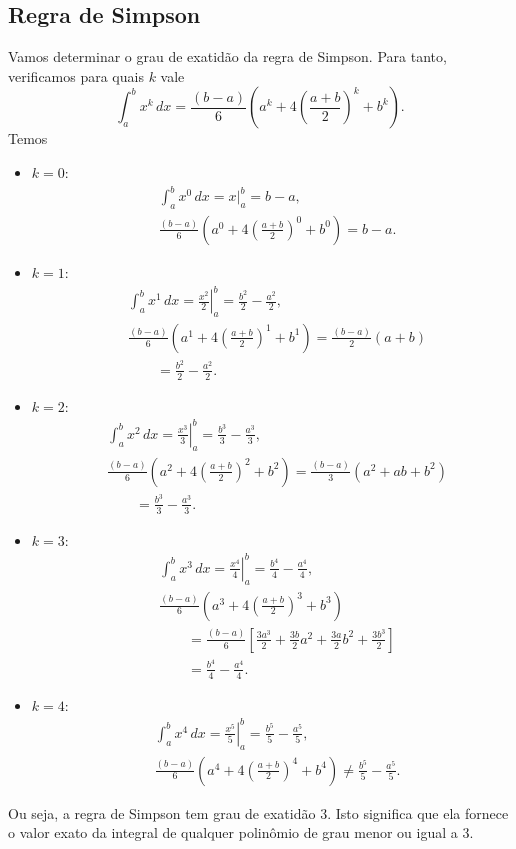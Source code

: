 \subsection{Regra de Simpson}

Vamos determinar o grau de exatidão da regra de Simpson. Para tanto, verificamos para quais $k$ vale
\begin{equation}
  \int_a^b x^k\,dx = \frac{(b-a)}{6}\left(a^k + 4\left(\frac{a+b}{2}\right)^k + b^k\right).
\end{equation}
Temos
\begin{itemize}
\item $k=0$:
  \begin{align}
    &\int_a^b x^0\,dx = \left. x\right|_a^b = b-a,\\
    &\frac{(b-a)}{6}\left(a^0 + 4\left(\frac{a+b}{2}\right)^0 + b^0\right) = b-a.
  \end{align}
\item $k=1$:
  \begin{align}
    &\int_a^b x^1\,dx = \left. \frac{x^2}{2}\right|_a^b = \frac{b^2}{2}-\frac{a^2}{2},\\
    &\frac{(b-a)}{6}\left(a^1 + 4\left(\frac{a+b}{2}\right)^1 + b^1\right) = \frac{(b-a)}{2}(a+b) \\
    &\qquad = \frac{b^2}{2}-\frac{a^2}{2}.
  \end{align}
\item $k=2$:
  \begin{align}
    &\int_a^b x^2\,dx = \left. \frac{x^3}{3}\right|_a^b = \frac{b^3}{3} - \frac{a^3}{3},\\
    &\frac{(b-a)}{6}\left(a^2 + 4\left(\frac{a+b}{2}\right)^2 + b^2\right) = \frac{(b-a)}{3}(a^2 + ab + b^2)\\
    &\qquad = \frac{b^3}{3} - \frac{a^3}{3}.
  \end{align}
\item $k=3$:
  \begin{align}
    &\int_a^b x^3\,dx = \left. \frac{x^4}{4}\right|_a^b = \frac{b^4}{4}-\frac{a^4}{4},\\
    &\frac{(b-a)}{6}\left(a^3 + 4\left(\frac{a+b}{2}\right)^3 + b^3\right) \\
    &\qquad = \frac{(b-a)}{6}\left[\frac{3 a^{3}}{2} + \frac{3 b}{2} a^{2} + \frac{3 a}{2} b^{2} + \frac{3 b^{3}}{2}\right]\\
    &\qquad = \frac{b^4}{4}-\frac{a^4}{4}.
  \end{align}
\item $k=4$:
  \begin{align}
    &\int_a^b x^4\,dx = \left. \frac{x^5}{5}\right|_a^b = \frac{b^5}{5}-\frac{a^5}{5},\\
    &\frac{(b-a)}{6}\left(a^4 + 4\left(\frac{a+b}{2}\right)^4 + b^4\right) \neq \frac{b^5}{5}-\frac{a^5}{5}.
  \end{align}
\end{itemize}
Ou seja, a regra de Simpson tem grau de exatidão $3$. Isto significa que ela fornece o valor exato da integral de qualquer polinômio de grau menor ou igual a 3.


